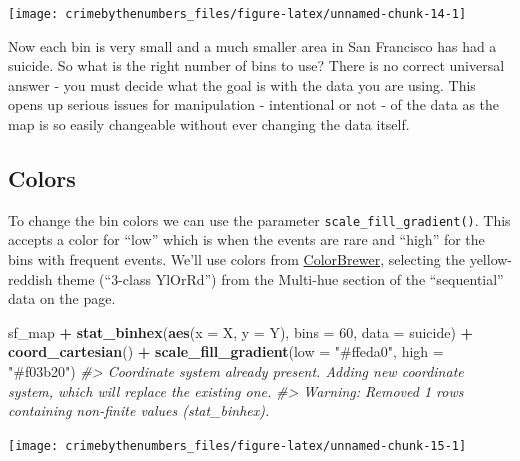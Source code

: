 \documentclass[
  12pt,
]{book}
\newenvironment{Shaded}{\begin{snugshade}}{\end{snugshade}}
\newcommand{\CommentTok}[1]{\textcolor[rgb]{0.37,0.37,0.37}{\textit{#1}}}
\newcommand{\DataTypeTok}[1]{\textcolor[rgb]{0.27,0.27,0.27}{#1}}
\newcommand{\DecValTok}[1]{\textcolor[rgb]{0.06,0.06,0.06}{#1}}
\newcommand{\KeywordTok}[1]{\textcolor[rgb]{0.27,0.27,0.27}{\textbf{#1}}}
\newcommand{\NormalTok}[1]{#1}
\newcommand{\OperatorTok}[1]{\textcolor[rgb]{0.43,0.43,0.43}{\textbf{#1}}}
\newcommand{\StringTok}[1]{\textcolor[rgb]{0.5,0.5,0.5}{#1}}
\begin{document}
\begin{center}\texttt{[image: crimebythenumbers\_files/figure-latex/unnamed-chunk-14-1]} \end{center}

Now each bin is very small and a much smaller area in San Francisco has had a suicide. So what is the right number of bins to use? There is no correct universal answer - you must decide what the goal is with the data you are using. This opens up serious issues for manipulation - intentional or not - of the data as the map is so easily changeable without ever changing the data itself.

\hypertarget{colors}{%
\subsection{Colors}\label{colors}}

To change the bin colors we can use the parameter \texttt{scale\_fill\_gradient()}. This accepts a color for ``low'' which is when the events are rare and ``high'' for the bins with frequent events. We'll use colors from \href{http://colorbrewer2.org}{ColorBrewer}, selecting the yellow-reddish theme (``3-class YlOrRd'') from the Multi-hue section of the ``sequential'' data on the page.

\begin{Shaded}
\begin{Highlighting}[]
\NormalTok{sf\_map }\OperatorTok{+}
\StringTok{  }\KeywordTok{stat\_binhex}\NormalTok{(}\KeywordTok{aes}\NormalTok{(}\DataTypeTok{x =}\NormalTok{ X, }\DataTypeTok{y =}\NormalTok{ Y),}
              \DataTypeTok{bins  =} \DecValTok{60}\NormalTok{,}
              \DataTypeTok{data =}\NormalTok{ suicide) }\OperatorTok{+}
\StringTok{  }\KeywordTok{coord\_cartesian}\NormalTok{() }\OperatorTok{+}
\StringTok{  }\KeywordTok{scale\_fill\_gradient}\NormalTok{(}\DataTypeTok{low =} \StringTok{"\#ffeda0"}\NormalTok{,}
                      \DataTypeTok{high =} \StringTok{"\#f03b20"}\NormalTok{)}
\CommentTok{\#\textgreater{} Coordinate system already present. Adding new coordinate system, which will replace the existing one.}
\CommentTok{\#\textgreater{} Warning: Removed 1 rows containing non{-}finite values (stat\_binhex).}
\end{Highlighting}
\end{Shaded}

\begin{center}\texttt{[image: crimebythenumbers\_files/figure-latex/unnamed-chunk-15-1]} \end{center}
\end{document}
